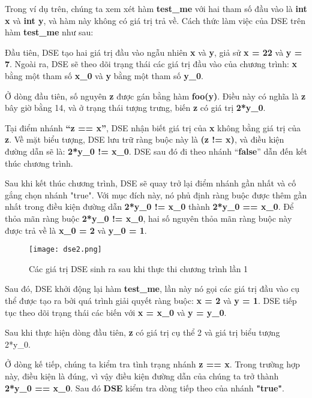 Trong ví dụ trên, chúng ta xem xét hàm \textbf{test\_me} với hai tham số đầu vào là \textbf{int x} và \textbf{int y}, và hàm này không có giá trị trả về. Cách thức làm việc của DSE trên hàm \textbf{test\_me} như sau: 

Đầu tiên, DSE tạo hai giá trị đầu vào ngẫu nhiên \textbf{x} và \textbf{y}, giả sử \textbf{x = 22} và \textbf{y = 7}. Ngoài ra, DSE sẽ theo dõi trạng thái các giá trị đầu vào của chương trình: \textbf{x} bằng một tham số \textbf{x\_0} và \textbf{y} bằng một tham số \textbf{y\_0}.

Ở dòng đầu tiên, số nguyên \textbf{z} được gán bằng hàm \textbf{foo(y)}. Điều này có nghĩa là \textbf{z} bây giờ bằng 14, và ở trạng thái tượng trưng, biến \textbf{z} có giá trị \textbf{2*y\_0}. 

Tại điểm nhánh \textbf{“z == x”}, DSE nhận biết giá trị của \textbf{x} không bằng giá trị của \textbf{z}. Về mặt biểu tượng, DSE lưu trữ ràng buộc này là \textbf{(z != x)}, và điều kiện đường dẫn sẽ là: \textbf{2*y\_0 != x\_0}. DSE sau đó đi theo nhánh “\textbf{false}” dẫn đến kết thúc chương trình.

Sau khi kết thúc chương trình, DSE sẽ quay trở lại điểm nhánh gần nhất và cố gắng chọn nhánh "true". Với mục đích này, nó phủ định ràng buộc được thêm gần nhất trong điều kiện đường dẫn \textbf{2*y\_0 != x\_0} thành \textbf{2*y\_0 == x\_0}. Để thỏa mãn ràng buộc \textbf{2*y\_0 != x\_0}, hai số nguyên thỏa mãn ràng buộc này được trả về là \textbf{x\_0 = 2 }và\textbf{ y\_0 = 1}.


\begin{center}
	\begin{figure}[htp]
		\begin{center}
			\texttt{[image: dse2.png]}
		\end{center}
		\caption{Các giá trị DSE sinh ra sau khi thực thi chương trình lần 1}
		\label{refhinh1}
	\end{figure}
\end{center}

Sau đó, DSE khởi động lại hàm \textbf{test\_me}, lần này nó gọi các giá trị đầu vào cụ thể được tạo ra bởi quá trình giải quyết ràng buộc: \textbf{x = 2} và \textbf{y = 1}. DSE tiếp tục theo dõi trạng thái các biến với \textbf{x = x\_0} và \textbf{y = y\_0}.

Sau khi thực hiện dòng đầu tiên, \textbf{z} có giá trị cụ thể 2 và giá trị biểu tượng 2*y\_0\textbf{}.

Ở dòng kế tiếp, chúng ta kiểm tra tình trạng nhánh \textbf{z == x}. Trong trường hợp này, điều kiện là đúng, vì vậy điều kiện đường dẫn của chúng ta trở thành \textbf{2*y\_0 == x\_0}. Sau đó \textbf{DSE} kiểm tra dòng tiếp theo của nhánh \textbf{"true"}.

